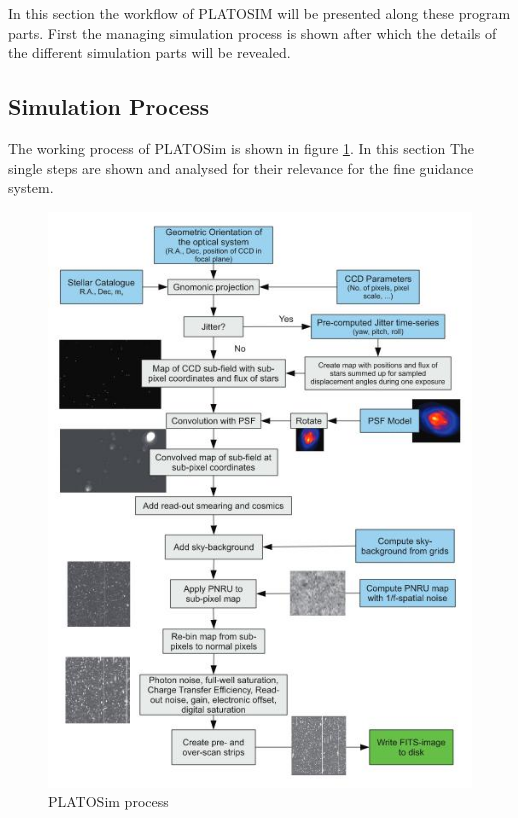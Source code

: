 In this section the workflow of PLATOSIM will be presented along these program parts. First the managing simulation process is shown after which the details of the different simulation parts will be revealed.   
\subsection{Simulation Process}  
The working process of PLATOSim is shown in figure \ref{fig:mesh1}. In this section The single steps are shown and analysed for their relevance for the fine guidance system.

\begin{figure}[h]
\centering
\includegraphics[width=\textwidth]{PLATOSim_Ablauf.jpg}
\caption{PLATOSim process}
\label{fig:mesh1}
\end{figure}

